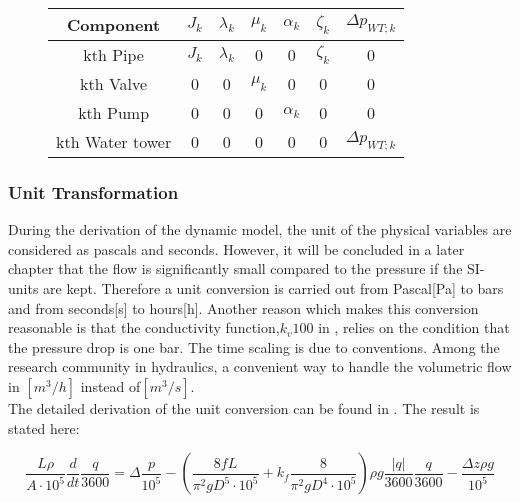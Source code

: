 \begin{figure}[H]
	\centering
\begin{tabular}{c|cccccc} 
  			\bfseries Component    &     $J_k$    &     $\lambda_k$    &    $\mu_k$    &   $\alpha_k$    &  $\zeta_k$   &	$\Delta p_{WT;k}$	\\ \hline
			kth Pipe		  	   &     $J_k$    &     $\lambda_k$    &    0          &   0             &  $\zeta_k$   &   0	    			\\ 
			kth Valve              &     0        &     0              &    $\mu_k$    &   0 		     &  0    		&   0					\\ 
			kth Pump 		       &     0        &     0              &    0          &   $\alpha_k$    &  0    		&   0	    			\\
			kth Water tower 	   &     0        &     0              &    0          &   0             &  0    		&   $\Delta p_{WT;k}$	    
\end{tabular}
		\label{tab:parametrization_model}

\end{figure}	

\subsubsection{Unit Transformation}
\label{unittransform}

During the derivation of the dynamic model, the unit of the physical variables are considered as pascals and seconds. However, it will be concluded in a later chapter that the flow is significantly small compared to the pressure if the SI-units are kept. Therefore a unit conversion is carried out from Pascal[Pa] to bars and from seconds[s] to hours[h]. Another reason which makes this conversion reasonable is that the conductivity function,$k_v100$ in , relies on the condition that the pressure drop is one bar. The time scaling is due to conventions. Among the research community in hydraulics, a convenient way to handle the volumetric flow in $[m^3/h]$ instead of$[m^3/s]$. 
\\
The detailed derivation of the unit conversion can be found in . The result is stated here: 

\begin{equation}
   \frac{L \rho}{A\cdot10^5} \frac{d}{dt}\frac{q}{3600} = \Delta \frac{p}{10^5} - (\frac{8fL}{\pi^{2}gD^5\cdot10^5} + k_f \frac{8}{\pi^2gD^4\cdot10^5}) \rho g \frac{|q|}{3600} \frac{q}{3600} - \frac{\Delta z \rho g}{10^5}
\end{equation}
